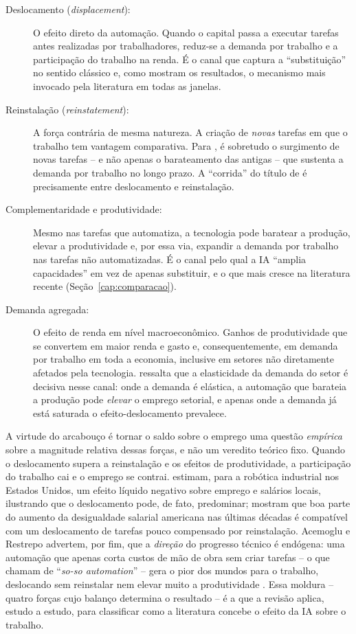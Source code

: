 \begin{description}
  \item[Deslocamento (\textit{displacement}):] O efeito direto da automação. Quando o capital passa a executar tarefas antes realizadas por trabalhadores, reduz-se a demanda por trabalho e a participação do trabalho na renda. É o canal que captura a ``substituição'' no sentido clássico e, como mostram os resultados, o mecanismo mais invocado pela literatura em todas as janelas.
  \item[Reinstalação (\textit{reinstatement}):] A força contrária de mesma natureza. A criação de \emph{novas} tarefas em que o trabalho tem vantagem comparativa. Para \textcite{acemogluRestrepo2019}, é sobretudo o surgimento de novas tarefas -- e não apenas o barateamento das antigas -- que sustenta a demanda por trabalho no longo prazo. A ``corrida'' do título de \textcite{acemogluRestrepo2018} é precisamente entre deslocamento e reinstalação.
  \item[Complementaridade e produtividade:] Mesmo nas tarefas que automatiza, a tecnologia pode baratear a produção, elevar a produtividade e, por essa via, expandir a demanda por trabalho nas tarefas não automatizadas. É o canal pelo qual a IA ``amplia capacidades'' em vez de apenas substituir, e o que mais cresce na literatura recente (Seção~\ref{cap:comparacao}).
  \item[Demanda agregada:] O efeito de renda em nível macroeconômico. Ganhos de produtividade que se convertem em maior renda e gasto e, consequentemente, em demanda por trabalho em toda a economia, inclusive em setores não diretamente afetados pela tecnologia. \textcite{bessen2018} ressalta que a elasticidade da demanda do setor é decisiva nesse canal: onde a demanda é elástica, a automação que barateia a produção pode \emph{elevar} o emprego setorial, e apenas onde a demanda já está saturada o efeito-deslocamento prevalece.
\end{description}

A virtude do arcabouço é tornar o saldo sobre o emprego uma questão \emph{empírica} sobre a magnitude relativa dessas forças, e não um veredito teórico fixo. Quando o deslocamento supera a reinstalação e os efeitos de produtividade, a participação do trabalho cai e o emprego se contrai. \textcite{acemogluRestrepo2020robots} estimam, para a robótica industrial nos Estados Unidos, um efeito líquido negativo sobre emprego e salários locais, ilustrando que o deslocamento pode, de fato, predominar; \textcite{acemogluRestrepo2022} mostram que boa parte do aumento da desigualdade salarial americana nas últimas décadas é compatível com um deslocamento de tarefas pouco compensado por reinstalação. Acemoglu e Restrepo advertem, por fim, que a \emph{direção} do progresso técnico é endógena: uma automação que apenas corta custos de mão de obra sem criar tarefas -- o que chamam de ``\textit{so-so automation}'' -- gera o pior dos mundos para o trabalho, deslocando sem reinstalar nem elevar muito a produtividade \parencite{acemogluRestrepo2020wrongai}. Essa moldura -- quatro forças cujo balanço determina o resultado -- é a que a revisão aplica, estudo a estudo, para
classificar como a literatura concebe o efeito da IA sobre o trabalho.

